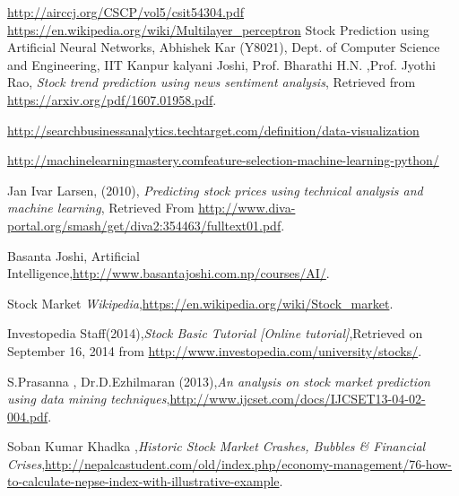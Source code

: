 
\newpage
{}
%
%
\begin{thebibliography}{9}
 	\bibitem{}\url{http://airccj.org/CSCP/vol5/csit54304.pdf}
	\bibitem{}\url{https://en.wikipedia.org/wiki/Multilayer_perceptron}
	\bibitem {}Stock Prediction using Artificial Neural Networks, Abhishek Kar (Y8021),  Dept. of Computer Science and Engineering, IIT Kanpur
  	kalyani Joshi, Prof. Bharathi H.N. ,Prof. Jyothi Rao, \emph{ Stock trend prediction using news sentiment analysis}, Retrieved from 
	\url{https://arxiv.org/pdf/1607.01958.pdf}.

	\bibitem{}\url{http://searchbusinessanalytics.techtarget.com/definition/data-visualization}


	\bibitem{}\url{http://machinelearningmastery.comfeature-selection-machine-learning-python/}

  	  Jan Ivar Larsen, (2010), \emph{ Predicting stock prices using technical analysis and machine learning}, Retrieved From \url{http://www.diva-portal.org/smash/get/diva2:354463/fulltext01.pdf}.

	Basanta Joshi, Artificial Intelligence,\url{http://www.basantajoshi.com.np/courses/AI/}.

	Stock Market \emph{Wikipedia},\url{https://en.wikipedia.org/wiki/Stock_market}.

	Investopedia Staff(2014),\emph{Stock Basic Tutorial [Online tutorial]},Retrieved on September 16, 2014 from \url{http://www.investopedia.com/university/stocks/}.

	S.Prasanna , Dr.D.Ezhilmaran (2013),\emph{An analysis on stock market prediction using data mining techniques},\url{http://www.ijcset.com/docs/IJCSET13-04-02-004.pdf}.

	Soban Kumar Khadka ,\emph{Historic Stock Market Crashes, Bubbles & Financial Crises},\url{http://nepalcastudent.com/old/index.php/economy-management/76-how-to-calculate-nepse-index-with-illustrative-example}.


\end{thebibliography}
